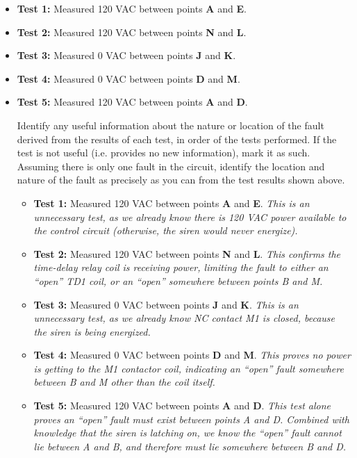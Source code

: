 \begin{itemize}
\item{} {\bf Test 1:} Measured 120 VAC between points {\bf A} and {\bf E}.
\vskip 25pt
\item{} {\bf Test 2:} Measured 120 VAC between points {\bf N} and {\bf L}.
\vskip 25pt
\item{} {\bf Test 3:} Measured 0 VAC between points {\bf J} and {\bf K}.
\vskip 25pt
\item{} {\bf Test 4:} Measured 0 VAC between points {\bf D} and {\bf M}.
\vskip 25pt
\item{} {\bf Test 5:} Measured 120 VAC between points {\bf A} and {\bf D}.
\vskip 25pt
\medskip

Identify any useful information about the nature or location of the fault derived from the results of each test, in order of the tests performed.  If the test is not useful (i.e. provides no new information), mark it as such.  Assuming there is only one fault in the circuit, identify the location and nature of the fault as precisely as you can from the test results shown above.

\vfil 

\eject






\begin{itemize}
\item{} {\bf Test 1:} Measured 120 VAC between points {\bf A} and {\bf E}.  {\it This is an unnecessary test, as we already know there is 120 VAC power available to the control circuit (otherwise, the siren would never energize).}
\vskip 5pt
\item{} {\bf Test 2:} Measured 120 VAC between points {\bf N} and {\bf L}.  {\it This confirms the time-delay relay coil is receiving power, limiting the fault to either an ``open'' TD1 coil, or an ``open'' somewhere between points B and M.}
\vskip 5pt
\item{} {\bf Test 3:} Measured 0 VAC between points {\bf J} and {\bf K}.  {\it This is an unnecessary test, as we already know NC contact M1 is closed, because the siren is being energized.}
\vskip 5pt
\item{} {\bf Test 4:} Measured 0 VAC between points {\bf D} and {\bf M}.  {\it This proves no power is getting to the M1 contactor coil, indicating an ``open'' fault somewhere between B and M other than the coil itself.}
\vskip 5pt
\item{} {\bf Test 5:} Measured 120 VAC between points {\bf A} and {\bf D}.  {\it This test alone proves an ``open'' fault must exist between points A and D.  Combined with knowledge that the siren is latching on, we know the ``open'' fault cannot lie between A and B, and therefore must lie somewhere between B and D.}
\end{itemize}


\end{itemize}

